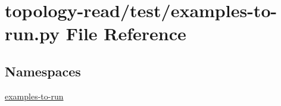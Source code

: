 \hypertarget{topology-read_2test_2examples-to-run_8py}{}\section{topology-\/read/test/examples-\/to-\/run.py File Reference}
\label{topology-read_2test_2examples-to-run_8py}
\subsection*{Namespaces}
\begin{DoxyCompactItemize}
\item 
 \hyperlink{namespaceexamples-to-run}{examples-\/to-\/run}
\end{DoxyCompactItemize}
